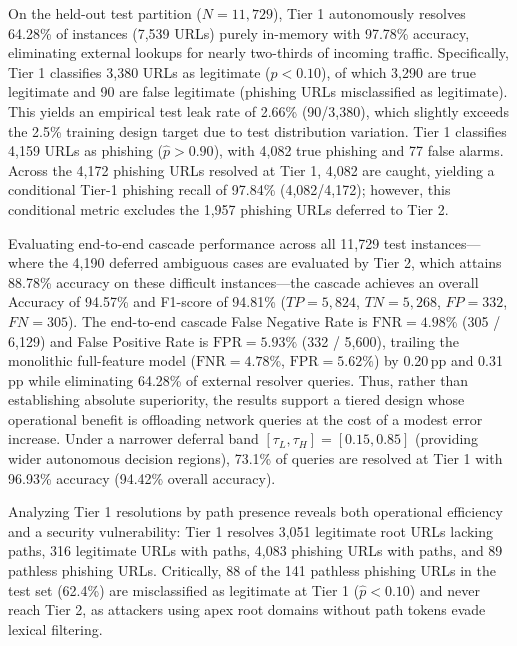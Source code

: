 On the held-out test partition ($N=11,729$), Tier 1 autonomously resolves 64.28\% of instances (7,539 URLs) purely in-memory with 97.78\% accuracy, eliminating external lookups for nearly two-thirds of incoming traffic. Specifically, Tier 1 classifies 3,380 URLs as legitimate ($\hat{p} < 0.10$), of which 3,290 are true legitimate and 90 are false legitimate (phishing URLs misclassified as legitimate). This yields an empirical test leak rate of 2.66\% (90/3,380), which slightly exceeds the 2.5\% training design target due to test distribution variation. Tier 1 classifies 4,159 URLs as phishing ($\hat{p} > 0.90$), with 4,082 true phishing and 77 false alarms. Across the 4,172 phishing URLs resolved at Tier 1, 4,082 are caught, yielding a conditional Tier-1 phishing recall of 97.84\% (4,082/4,172); however, this conditional metric excludes the 1,957 phishing URLs deferred to Tier 2.

Evaluating end-to-end cascade performance across all 11,729 test instances—where the 4,190 deferred ambiguous cases are evaluated by Tier 2, which attains 88.78\% accuracy on these difficult instances—the cascade achieves an overall Accuracy of 94.57\% and F1-score of 94.81\% ($TP=5,824$, $TN=5,268$, $FP=332$, $FN=305$). The end-to-end cascade False Negative Rate is $\text{FNR} = 4.98\%$ (305 / 6,129) and False Positive Rate is $\text{FPR} = 5.93\%$ (332 / 5,600), trailing the monolithic full-feature model ($\text{FNR} = 4.78\%$, $\text{FPR} = 5.62\%$) by 0.20\,pp and 0.31\,pp while eliminating 64.28\% of external resolver queries. Thus, rather than establishing absolute superiority, the results support a tiered design whose operational benefit is offloading network queries at the cost of a modest error increase. Under a narrower deferral band $[\tau_L, \tau_H] = [0.15, 0.85]$ (providing wider autonomous decision regions), 73.1\% of queries are resolved at Tier 1 with 96.93\% accuracy (94.42\% overall accuracy).

Analyzing Tier 1 resolutions by path presence reveals both operational efficiency and a security vulnerability: Tier 1 resolves 3,051 legitimate root URLs lacking paths, 316 legitimate URLs with paths, 4,083 phishing URLs with paths, and 89 pathless phishing URLs. Critically, 88 of the 141 pathless phishing URLs in the test set (62.4\%) are misclassified as legitimate at Tier 1 ($\hat{p} < 0.10$) and never reach Tier 2, as attackers using apex root domains without path tokens evade lexical filtering. 

